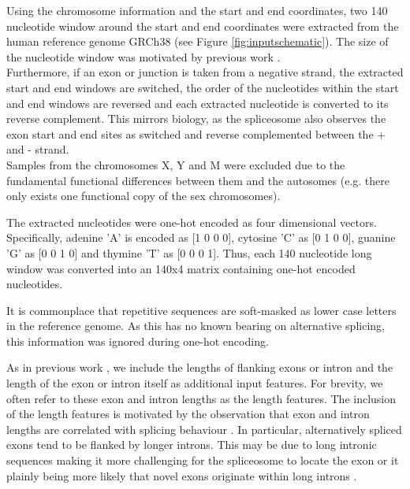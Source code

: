 Using the chromosome information and the start and end coordinates, two 140 nucleotide window around the start and end coordinates were extracted from the human reference genome GRCh38 (see Figure \ref{fig:inputschematic}). The size of the nucleotide window was motivated by previous work \cite{dsc}.\\
Furthermore, if an exon or junction is taken from a negative strand, the extracted start and end windows are switched, the order of the nucleotides within the start and end windows are reversed and each extracted nucleotide is converted to its reverse complement. This mirrors biology, as the spliceosome also observes the exon start and end sites as switched and reverse complemented between the + and - strand.\\ 
Samples from the chromosomes X, Y and M were excluded due to the fundamental functional differences between them and the autosomes (e.g. there only exists one functional copy of the sex chromosomes).

The extracted nucleotides were one-hot encoded as four dimensional vectors. Specifically, adenine 'A' is encoded as [1 0 0 0], cytosine 'C' as [0 1 0 0], guanine 'G' as [0 0 1 0] and thymine 'T' as [0 0 0 1]. Thus, each 140 nucleotide long window was converted into an 140x4 matrix containing one-hot encoded nucleotides.

It is commonplace that repetitive sequences are soft-masked as lower case letters in the reference genome. As this has no known bearing on alternative splicing, this information was ignored during one-hot encoding.

As in previous work \cite{dsc} \cite{flawed4}, we include the lengths of flanking exons or intron and the length of the exon or intron itself as additional input features. For brevity, we often refer to these exon and intron lengths as the length features. The inclusion of the length features is motivated by the observation that exon and intron lengths are correlated with splicing behaviour \cite{lengthsref1} \cite{lengthsref2}. In particular, alternatively spliced exons tend to be flanked by longer introns. This may be due to long intronic sequences making it more challenging for the spliceosome to locate the exon or it plainly being more likely that novel exons originate within long introns \cite{bestlengthsref}. 

